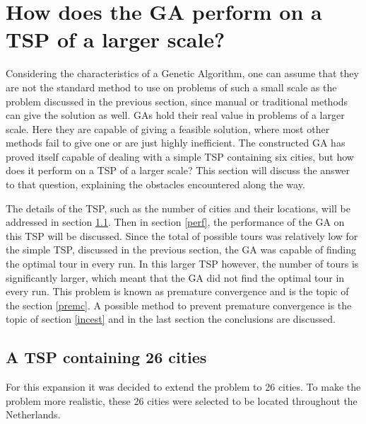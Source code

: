 \section{How does the GA perform on a TSP of a larger scale?} \label{largeTSP}

\par
Considering the characteristics of a Genetic Algorithm, one can assume that they are not the standard method to use on problems of such a small scale as the problem discussed in the previous section, since manual or traditional methods can give the solution as well. GAs hold their real value in problems of a larger scale. Here they are capable of giving a feasible solution, where most other methods fail to give one or are just highly inefficient. The constructed GA has proved itself capable of dealing with a simple TSP containing six cities, but how does it perform on a TSP of a larger scale? This section will discuss the answer to that question, explaining the obstacles encountered along the way.
\par
The details of the TSP, such as the number of cities and their locations, will be addressed in section \ref{tsp}. Then in section \ref{perf}, the performance of the GA on this TSP will be discussed. Since the total of possible tours was relatively low for the simple TSP, discussed in the previous section, the GA was capable of finding the optimal tour in every run. In this larger TSP however, the number of tours is significantly larger, which meant that the GA did not find the optimal tour in every run. This problem is known as premature convergence and is the topic of the section \ref{premc}. A possible method to prevent premature convergence is the topic of section \ref{incest} and in the last section the conclusions are discussed.

\subsection{A TSP containing 26 cities} \label{tsp} %
\par
For this expansion it was decided to extend the problem to 26 cities. To make the problem more realistic, these 26 cities were selected to be located throughout the Netherlands. 


